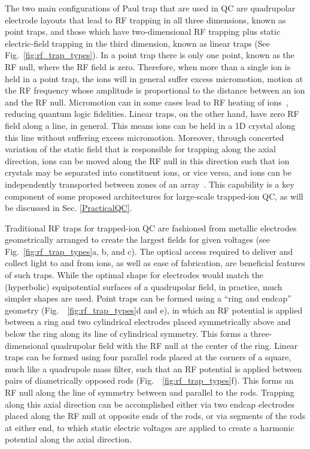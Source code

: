 \documentclass[%
12pt,
 amsmath,amssymb,
]{revtex4-2}
\begin{document}
The two main configurations of Paul trap that are used in QC are quadrupolar electrode layouts that lead to RF trapping in all three dimensions, known as point traps, and those which have two-dimensional RF trapping plus static electric-field trapping in the third dimension, known as linear traps (See Fig.~\ref{fig:rf_trap_types}).  In a point trap there is only one point, known as the RF null, where the RF field is zero.  Therefore, when more than a single ion is held in a point trap, the ions will in general suffer excess micromotion, motion at the RF frequency whose amplitude is proportional to the distance between an ion and the RF null.  Micromotion can in some cases lead to RF heating of ions~\cite{Wineland1998}, reducing quantum logic fidelities.  Linear traps, on the other hand, have zero RF field along a line, in general.  This means ions can be held in a 1D crystal along this line without suffering excess micromotion.  Moreover, through concerted variation of the static field that is responsible for trapping along the axial direction, ions can be moved along the RF null in this direction such that ion crystals may be separated into constituent ions, or vice versa, and ions can be independently transported between zones of an array~\cite{NIST:ion_transport:2002}.  This capability is a key component of some proposed architectures for large-scale trapped-ion QC, as will be discussed in Sec. \ref{PracticalQC}.

Traditional RF traps for trapped-ion QC are fashioned from metallic electrodes geometrically arranged to create the largest fields for given voltages (see Fig.~\ref{fig:rf_trap_types}a, b, and c).  The optical access required to deliver and collect light to and from ions, as well as ease of fabrication, are beneficial features of such traps.  While the optimal shape for electrodes would match the (hyperbolic) equipotential surfaces of a quadrupolar field, in practice, much simpler shapes are used.  Point traps can be formed using a ``ring and endcap'' geometry (Fig.~~\ref{fig:rf_trap_types}d and e), in which an RF potential is applied between a ring and two cylindrical electrodes placed symmetrically above and below the ring along its line of cylindrical symmetry.  This forms a three-dimensional quadrupolar field with the RF null at the center of the ring.  Linear traps can be formed using four parallel rods placed at the corners of a square, much like a quadrupole mass filter, such that an RF potential is applied between pairs of diametrically opposed rods (Fig.~~\ref{fig:rf_trap_types}f).  This forms an RF null along the line of symmetry between and parallel to the rods.  Trapping along this axial direction can be accomplished either via two endcap electrodes placed along the RF null at opposite ends of the rods, or via segments of the rods at either end, to which static electric voltages are applied to create a harmonic potential along the axial direction.
\end{document}
